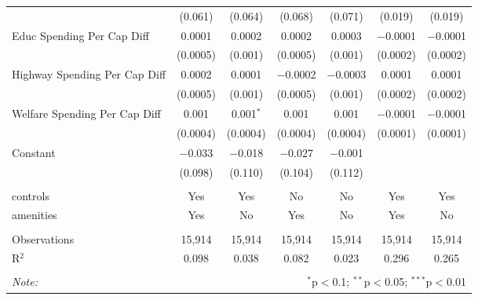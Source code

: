 \begin{table}[!htbp]
\begin{tabular}{@{\extracolsep{5pt}}lcccccc}
  & (0.061) & (0.064) & (0.068) & (0.071) & (0.019) & (0.019) \\ 
  Educ Spending Per Cap Diff & 0.0001 & 0.0002 & 0.0002 & 0.0003 & $-$0.0001 & $-$0.0001 \\ 
  & (0.0005) & (0.001) & (0.0005) & (0.001) & (0.0002) & (0.0002) \\ 
  Highway Spending Per Cap Diff & 0.0002 & 0.0001 & $-$0.0002 & $-$0.0003 & 0.0001 & 0.0001 \\ 
  & (0.0005) & (0.001) & (0.0005) & (0.001) & (0.0002) & (0.0002) \\ 
  Welfare Spending Per Cap Diff & 0.001 & 0.001$^{*}$ & 0.001 & 0.001 & $-$0.0001 & $-$0.0001 \\ 
  & (0.0004) & (0.0004) & (0.0004) & (0.0004) & (0.0001) & (0.0001) \\ 
  Constant & $-$0.033 & $-$0.018 & $-$0.027 & $-$0.001 &  &  \\ 
  & (0.098) & (0.110) & (0.104) & (0.112) &  &  \\ 
 \hline \\[-1.8ex] 
controls & Yes & Yes & No & No & Yes & Yes \\ 
amenities & Yes & No & Yes & No & Yes & No \\ 
\hline \\[-1.8ex] 
Observations & 15,914 & 15,914 & 15,914 & 15,914 & 15,914 & 15,914 \\ 
R$^{2}$ & 0.098 & 0.038 & 0.082 & 0.023 & 0.296 & 0.265 \\ 
\hline 
\hline \\[-1.8ex] 
\textit{Note:}  & \multicolumn{6}{r}{$^{*}$p$<$0.1; $^{**}$p$<$0.05; $^{***}$p$<$0.01} \\ 
\end{tabular} 
\end{table} 
